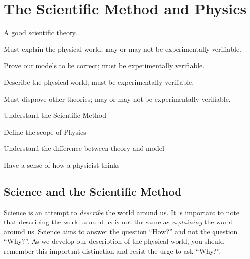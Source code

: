 %
\chapter{The Scientific Method and Physics}
\label{Introduction}

\begin{checkpointMC}{A good scientific theory...}
\item Must explain the physical world; may or may not be experimentally verifiable.
\item Prove our models to be correct; must be experimentally verifiable.
\item Describe the physical world; must be experimentally verifiable.
\item Must disprove other theories; may or may not be experimentally verifiable.
\end{checkpointMC}


\begin{learningObjectives}
\item Understand the Scientific Method
\item Define the scope of Physics
\item Understand the difference between theory and model
\item Have a sense of how a physicist thinks
\end{learningObjectives}

\section{Science and the Scientific Method}
Science is an attempt to \textit{describe} the world around us. It is important to note that describing the world around us is not the same as \textit{explaining} the world around us. Science aims to answer the question ``How?'' and not the question ``Why?''. As we develop our description of the physical world, you should remember this important distinction and resist the urge to ask ``Why?''.

